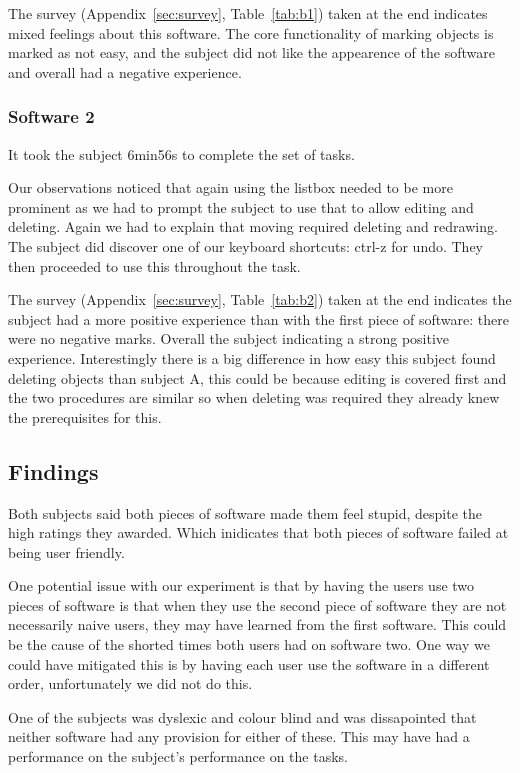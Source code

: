 \documentclass[a4paper,11pt,oneside]{article}
\begin{document}
The survey (Appendix~\ref{sec:survey}, Table~\ref{tab:b1}) taken at the end indicates mixed feelings about this software.  The core functionality of marking objects is marked as not easy, and the subject did not like the appearence of the software and overall had a negative experience.


\subsubsection{Software 2}
It took the subject 6min56s to complete the set of tasks.

Our observations noticed that again using the listbox needed to be more prominent as we had to prompt the subject to use that to allow editing and deleting.  Again we had to explain that moving required deleting and redrawing.  The subject did discover one of our keyboard shortcuts: ctrl-z for undo.  They then proceeded to use this throughout the task.

The survey (Appendix~\ref{sec:survey}, Table~\ref{tab:b2}) taken at the end indicates the subject had a more positive experience than with the first piece of software: there were no negative marks.  Overall the subject indicating a strong positive experience.  Interestingly there is a big difference in how easy this subject found deleting objects than subject A, this could be because editing is covered first and the two procedures are similar so when deleting was required they already knew the prerequisites for this.

\subsection{Findings}
Both subjects said both pieces of software made them feel stupid, despite the high ratings they awarded.  Which inidicates that both pieces of software failed at being user friendly.

One potential issue with our experiment is that by having the users use two pieces of software is that when they use the second piece of software they are not necessarily naive users, they may have learned from the first software.  This could be the cause of the shorted times both users had on software two.  One way we could have mitigated this is by having each user use the software in a different order, unfortunately we did not do this.

One of the subjects was dyslexic and colour blind and was dissapointed that neither software had any provision for either of these.  This may have had a performance on the subject's performance on the tasks.
\end{document}
